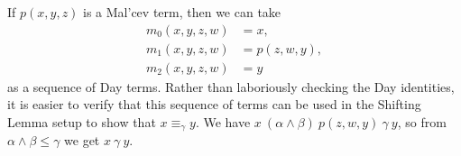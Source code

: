 \documentclass[letterpaper,11pt]{article}
\begin{document}
\begin{comment}
\begin{cor} A variety $\cV$ is not congruence modular if and only if there are congruences $\alpha, \beta, \gamma$ on the free algebra $\cF_\cV(x,y,z,w)$ such that
\begin{align*}
\gamma &< \alpha,\\
\alpha \circ \beta &= \beta \circ \gamma \circ \beta,\\
\alpha \wedge \beta &\le \gamma.
\end{align*}
If $\cV$ is also idempotent, then we can strengthen the above as follows: $\cV$ fails to be congruence modular iff the congruence $\theta$ of $\cF_{\cV}(x,y)^2$ generated by identifying $(y,x)$ with $(y,y)$ satisfies
\[
\theta < \ker \pi_1, \;\;\; \ker \pi_2 \circ \theta \circ \ker \pi_2 = 1.
\]
\end{cor}
\begin{proof} Let $\theta_{a,b}$ be the congruence generated by identifying $a,b$, and define $\alpha = \theta_{x,y} \vee \theta_{z,w}, \beta = \theta_{x,z} \vee \theta_{y,w}$, and $\gamma = \theta_{z,w} \vee (\alpha \wedge \beta)$. Then $\gamma < \alpha$ iff $\cV$ fails to have Day terms, and the other displayed equations involving $\alpha,\beta,\gamma$ follow directly from the definitions.

If $\cV$ is idempotent, then we also have $\alpha \circ \beta = 1$, and $\cF_{\cV}(x,y,z,w)/\alpha \wedge \beta \cong \cF_{\cV}(x,y,z,w)/\alpha \times \cF_{\cV}(x,y,z,w)/\beta \cong \cF_{\cV}(x,y)^2$. Then $\theta$ is the congruence corresponding to $\gamma/\alpha \wedge \beta$ under this isomorphism, so we get the displayed equations involving $\theta$.
\end{proof}
\end{comment}

\begin{ex} If $p(x,y,z)$ is a Mal'cev term, then we can take
\begin{align*}
m_0(x,y,z,w) &= x,\\
m_1(x,y,z,w) &= p(z,w,y),\\
m_2(x,y,z,w) &= y
\end{align*}
as a sequence of Day terms. Rather than laboriously checking the Day identities, it is easier to verify that this sequence of terms can be used in the Shifting Lemma setup to show that $x \equiv_\gamma y$. We have $x\ (\alpha \wedge \beta)\ p(z,w,y)\ \gamma\ y$, so from $\alpha \wedge \beta \le \gamma$ we get $x\ \gamma\ y$.
\end{ex}
\end{document}

